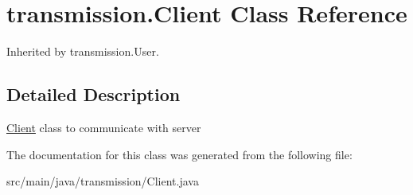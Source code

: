 \hypertarget{classtransmission_1_1_client}{}\section{transmission.\+Client Class Reference}
\label{classtransmission_1_1_client}


Inherited by transmission.\+User.



\subsection{Detailed Description}
\hyperlink{classtransmission_1_1_client}{Client} class to communicate with server 

The documentation for this class was generated from the following file\+:\begin{DoxyCompactItemize}
\item 
src/main/java/transmission/Client.\+java\end{DoxyCompactItemize}
